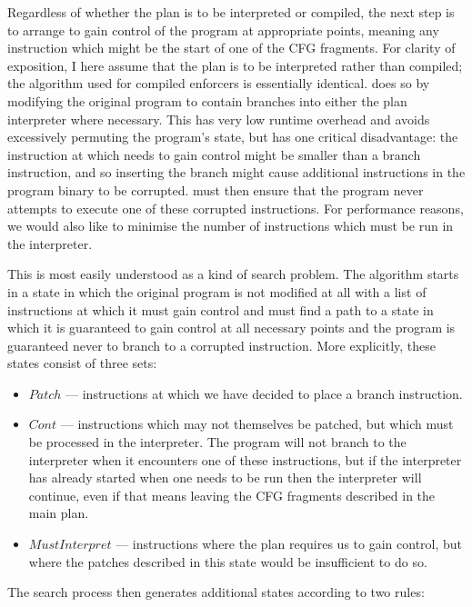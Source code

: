 \label{sect:enforce:assign_entry_points}
Regardless of whether the plan is to be interpreted or compiled, the
next step is to arrange to gain control of the program at appropriate
points, meaning any instruction which might be the start of one of the
CFG fragments.  For clarity of exposition, I here assume that the plan
is to be interpreted rather than compiled; the algorithm used for
compiled enforcers is essentially identical. {\Technique} does so by
modifying the original program to contain branches into either the
plan interpreter where necessary.  This has very low runtime overhead
and avoids excessively permuting the program's state, but has one
critical disadvantage: the instruction at which {\technique} needs to
gain control might be smaller than a branch instruction, and so
inserting the branch might cause additional instructions in the
program binary to be corrupted.  {\Technique} must then ensure that
the program never attempts to execute one of these corrupted
instructions.  For performance reasons, we would also like to minimise
the number of instructions which must be run in the interpreter.

This is most easily understood as a kind of search problem.  The
algorithm starts in a state in which the original program is not
modified at all with a list of instructions at which it must gain
control and must find a path to a state in which it is guaranteed to
gain control at all necessary points and the program is guaranteed
never to branch to a corrupted instruction.  More explicitly, these
states consist of three sets:

\begin{itemize}
\item $Patch$ --- instructions at which we have decided to place a
  branch instruction.
\item $Cont$ --- instructions which may not themselves be patched, but
  which must be processed in the interpreter.  The program will not
  branch to the interpreter when it encounters one of these
  instructions, but if the interpreter has already started when one
  needs to be run then the interpreter will continue, even if that
  means leaving the CFG fragments described in the main plan.
\item $MustInterpret$ --- instructions where the plan requires us to
  gain control, but where the patches described in this state would be
  insufficient to do so.
\end{itemize}

The search process then generates additional states according to two
rules:

